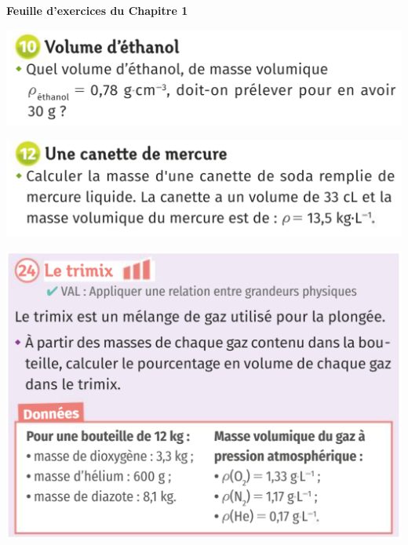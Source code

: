 \renewcommand{\thesubsection}{\textcolor{red}{\Roman{section}.\arabic{subsection}}}
\renewcommand{\thesubsubsection}{\textcolor{red}{\Roman{section}.\arabic{subsection}.\alph{subsubsection}}}

\setcounter{section}{0}
\sndEnTeteDeux

\begin{center}
\begin{mdframed}[style=titr, leftmargin=60pt, rightmargin=60pt, innertopmargin=7pt, innerbottommargin=7pt, innerrightmargin=8pt, innerleftmargin=8pt]

\begin{center}
\large{\textbf{Feuille d'exercices du Chapitre 1}}
\end{center}

\end{mdframed}
\end{center}

\includegraphics[scale=0.9]{Images/Chapitre_1/Exo_1_Chap1.png}
\vspace{1cm}

\includegraphics[scale=0.9]{Images/Chapitre_1/Exo_2_Chap1.png}
\vspace{1cm}

\includegraphics[scale=0.7]{Images/Chapitre_1/Exo_5_Chap1.png}
\vspace{1cm}

